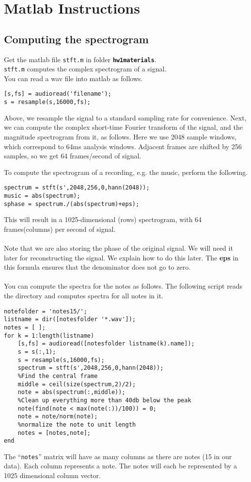 \section{Matlab Instructions}

\subsection{Computing the spectrogram}
Get the matlab file \verb|stft.m| in folder \texttt{\textbf{hw1materials}}.\\
\verb|stft.m| computes the complex spectrogram of a signal.\\
You can read a wav file into matlab as follows.
\begin{lstlisting}
[s,fs] = audioread('filename');
s = resample(s,16000,fs);
\end{lstlisting}

Above, we resample the signal to a standard sampling rate for convenience. Next, we can compute the complex short-time Fourier transform of the signal, and the magnitude spectrogram from it, as follows. Here we use 2048 sample windows, which correspond to 64ms analysis windows. Adjacent frames are shifted by 256 samples, so we get 64 frames/second of signal.

To compute the spectrogram of a recording, e.g. the music, perform the following.
\begin{lstlisting}
spectrum = stft(s',2048,256,0,hann(2048));
music = abs(spectrum);
sphase = spectrum./(abs(spectrum)+eps);
\end{lstlisting}
This will result in a 1025-dimensional (rows) spectrogram, with 64 frames(columns) per second of signal.
\\
\\
Note that we are also storing the phase of the original signal. We will need it later for reconstructing the signal. We explain how to do this later. The \textbf{eps} in this formula ensures that the denominator does not go to zero.
\\
\\
You can compute the spectra for the notes as follows. The following script reads the directory and computes spectra for all notes in it.
\begin{lstlisting}
notefolder = 'notes15/';
listname = dir([notesfolder '*.wav']);
notes = [ ];
for k = 1:length(listname)
    [s,fs] = audioread([notesfolder listname(k).name]);
    s = s(:,1);
    s = resample(s,16000,fs);
    spectrum = stft(s',2048,256,0,hann(2048));
    %Find the central frame
    middle = ceil(size(spectrum,2)/2);
    note = abs(spectrum(:,middle));
    %Clean up everything more than 40db below the peak
    note(find(note < max(note(:))/100)) = 0;
    note = note/norm(note);
    %normalize the note to unit length
    notes = [notes,note];
end
\end{lstlisting}
The ``\texttt{notes}'' matrix will have as many columns as there are notes (15 in our data). Each column represents a note. The notes will each be represented by a 1025 dimensional column vector.


